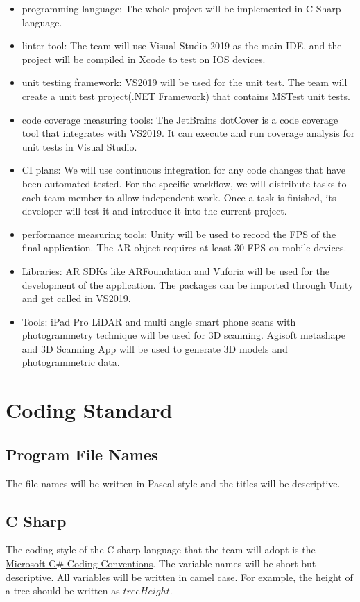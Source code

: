 \documentclass{article}
\begin{document}
\begin{itemize}
\item programming language: The whole project will be implemented in C Sharp language.
\item linter tool: The team will use Visual Studio 2019 as the main IDE, and the project will be compiled in Xcode to test on IOS devices.
\item unit testing framework: VS2019 will be used for the unit test. The team will create a unit test project(.NET Framework) that contains MSTest unit tests.
\item code coverage measuring tools: The JetBrains dotCover is a code coverage tool that integrates with VS2019. It can execute and run coverage analysis for unit tests in Visual Studio.
\item CI plans: We will use continuous integration for any code changes that have been automated tested. For the specific workflow, we will distribute tasks to each team member to allow independent work. Once a task is finished, its developer will test it and introduce it into the current project. 
\item performance measuring tools: Unity will be used to record the FPS of the final application. The AR object requires at least 30 FPS on mobile devices.
\item Libraries: AR SDKs like ARFoundation and Vuforia will be used for the development of the application. The packages can be imported through Unity and get called in VS2019.
\item Tools: iPad Pro LiDAR and multi angle smart phone scans with photogrammetry technique will be used for 3D scanning. Agisoft metashape and 3D Scanning App will be used to generate 3D models and photogrammetric data.
\end{itemize}

\section{Coding Standard}
\subsection{Program File Names}
The file names will be written in Pascal style and the titles will be descriptive.

\subsection{C Sharp}
The coding style of the C sharp language that the team will adopt is the \href{https://learn.microsoft.com/en-us/dotnet/csharp/fundamentals/coding-style/coding-conventions}{Microsoft C\# Coding Conventions}. The variable names will be short but descriptive. All variables will be written in camel case. For example, the height of a tree should be written as $treeHeight$.
\end{document}
